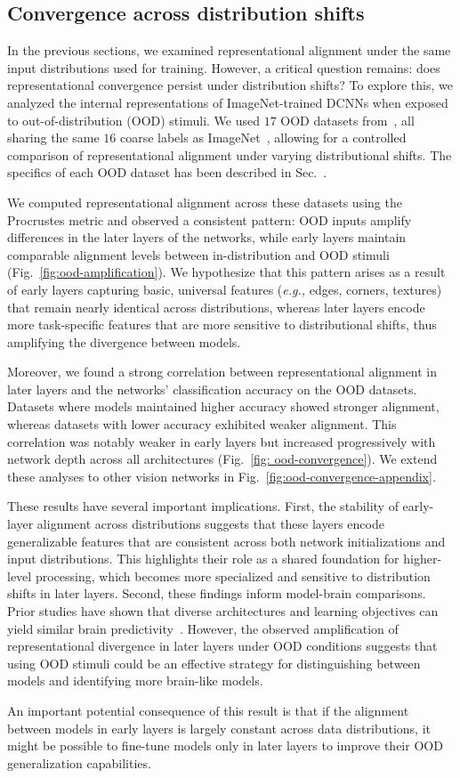 \subsection{Convergence across distribution shifts}

\label{sec:ood-results}
In the previous sections, we examined representational alignment under the same input distributions used for training. However, a critical question remains: does representational convergence persist under distribution shifts? To explore this, we analyzed the internal representations of ImageNet-trained DCNNs when exposed to out-of-distribution (OOD) stimuli. We used $17$ OOD datasets from~\citep{geirhos2018imagenet}, all sharing the same $16$ coarse labels as ImageNet~\citep{deng2009imagenet}, allowing for a controlled comparison of representational alignment under varying distributional shifts. The specifics of each OOD dataset has been described in Sec.~.


We computed representational alignment across these datasets using the Procrustes metric and observed a consistent pattern: OOD inputs amplify differences in the later layers of the networks, while early layers maintain comparable alignment levels between in-distribution and OOD stimuli (Fig.~\ref{fig:ood-amplification}). We hypothesize that this pattern arises as a result of early layers capturing basic, universal features (\emph{e.g.,} edges, corners, textures) that remain nearly identical across distributions, whereas later layers encode more task-specific features that are more sensitive to distributional shifts, thus amplifying the divergence between models.

Moreover, we found a strong correlation between representational alignment in later layers and the networks' classification accuracy on the OOD datasets. Datasets where models maintained higher accuracy showed stronger alignment, whereas datasets with lower accuracy exhibited weaker alignment. This correlation was notably weaker in early layers but increased progressively with network depth across all architectures (Fig.~\ref{fig: ood-convergence}). We extend these analyses to other vision networks in Fig.~\ref{fig:ood-convergence-appendix}.

These results have several important implications. First, the stability of early-layer alignment across distributions suggests that these layers encode generalizable features that are consistent across both network initializations and input distributions. This highlights their role as a shared foundation for higher-level processing, which becomes more specialized and sensitive to distribution shifts in later layers. Second, these findings inform model-brain comparisons. Prior studies have shown that diverse architectures and learning objectives can yield similar brain predictivity~\citep{conwell2024large}. However, the observed amplification of representational divergence in later layers under OOD conditions suggests that using OOD stimuli could be an effective strategy for distinguishing between models and identifying more brain-like models. 

An important potential consequence of this result is that if the alignment between models in early layers is largely constant across data distributions, it might be possible to fine-tune models only in later layers to improve their OOD generalization capabilities.